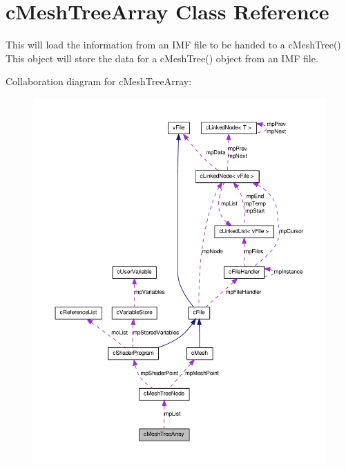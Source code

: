 \hypertarget{classc_mesh_tree_array}{
\section{cMeshTreeArray Class Reference}
\label{classc_mesh_tree_array}
}


This will load the information from an IMF file to be handed to a cMeshTree() This object will store the data for a cMeshTree() object from an IMF file.  




Collaboration diagram for cMeshTreeArray:\nopagebreak
\begin{figure}[H]
\begin{center}
\leavevmode
\includegraphics[width=400pt]{classc_mesh_tree_array__coll__graph}
\end{center}
\end{figure}
